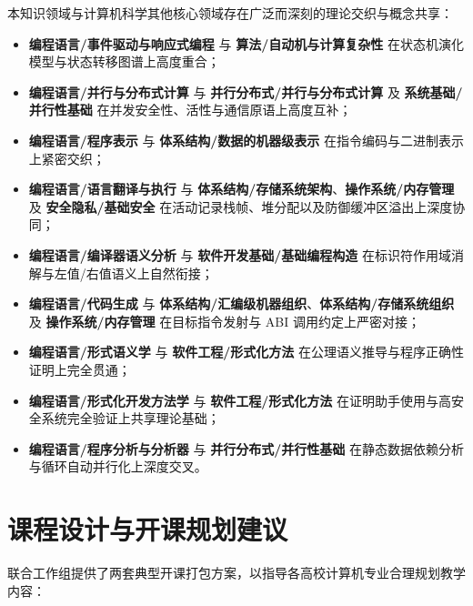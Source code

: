 本知识领域与计算机科学其他核心领域存在广泛而深刻的理论交织与概念共享：
\begin{itemize}
    \item \textbf{编程语言/事件驱动与响应式编程} 与 \textbf{算法/自动机与计算复杂性} 在状态机演化模型与状态转移图谱上高度重合；
    \item \textbf{编程语言/并行与分布式计算} 与 \textbf{并行分布式/并行与分布式计算} 及 \textbf{系统基础/并行性基础} 在并发安全性、活性与通信原语上高度互补；
    \item \textbf{编程语言/程序表示} 与 \textbf{体系结构/数据的机器级表示} 在指令编码与二进制表示上紧密交织；
    \item \textbf{编程语言/语言翻译与执行} 与 \textbf{体系结构/存储系统架构}、\textbf{操作系统/内存管理} 及 \textbf{安全隐私/基础安全} 在活动记录栈帧、堆分配以及防御缓冲区溢出上深度协同；
    \item \textbf{编程语言/编译器语义分析} 与 \textbf{软件开发基础/基础编程构造} 在标识符作用域消解与左值/右值语义上自然衔接；
    \item \textbf{编程语言/代码生成} 与 \textbf{体系结构/汇编级机器组织}、\textbf{体系结构/存储系统组织} 及 \textbf{操作系统/内存管理} 在目标指令发射与 ABI 调用约定上严密对接；
    \item \textbf{编程语言/形式语义学} 与 \textbf{软件工程/形式化方法} 在公理语义推导与程序正确性证明上完全贯通；
    \item \textbf{编程语言/形式化开发方法学} 与 \textbf{软件工程/形式化方法} 在证明助手使用与高安全系统完全验证上共享理论基础；
    \item \textbf{编程语言/程序分析与分析器} 与 \textbf{并行分布式/并行性基础} 在静态数据依赖分析与循环自动并行化上深度交叉。
\end{itemize}

\section{课程设计与开课规划建议}

联合工作组提供了两套典型开课打包方案，以指导各高校计算机专业合理规划教学内容：

